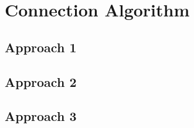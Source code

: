 

% 

\section{Connection Algorithm}

\subsection{Approach 1}
\subsection{Approach 2}
\subsection{Approach 3}
% 